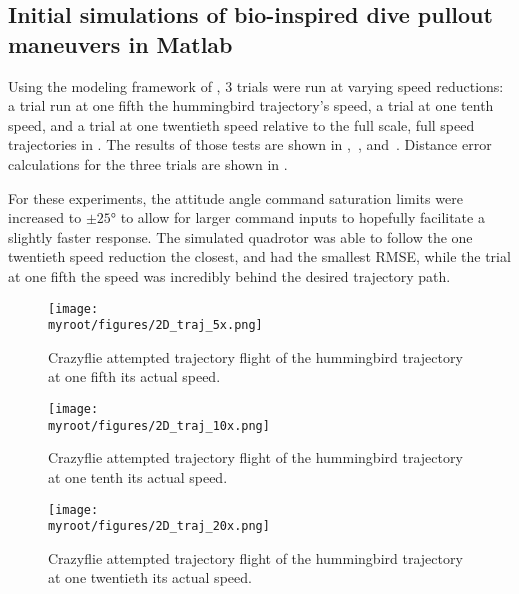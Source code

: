\documentclass[onecolumn,10pt]{IEEEtran}
\newcommand{\myroot}{../}
\newcommand{\Matlab}{Matlab}
\begin{document}
\subsection{Initial simulations of bio-inspired dive pullout maneuvers in \Matlab}
Using the modeling framework of \cite{hartman2014quadcopter}, 3 trials were run at varying speed reductions: a trial run at one fifth the hummingbird trajectory's speed, a trial at one tenth speed, and a trial at one twentieth speed relative to the full scale, full speed trajectories in \cite{clark2009courtship}. The results of those tests are shown in ,~, and~. Distance error calculations for the three trials are shown in . 

For these experiments, the attitude angle command saturation limits were increased to $\pm\ang{25}$ to allow for larger command inputs to hopefully facilitate a slightly faster response. The simulated quadrotor was able to follow the one twentieth speed reduction the closest, and had the smallest RMSE, while the trial at one fifth the speed was incredibly behind the desired trajectory path.

\begin{figure}[p]
\begin{center}
\texttt{[image: \\myroot/figures/2D\_traj\_5x.png]}
\end{center}
\caption{Crazyflie attempted trajectory flight of the hummingbird trajectory at one fifth its actual speed.}
\label{fig:onefifthspeed}
\end{figure}

\begin{figure}[p]
\begin{center}
\texttt{[image: \\myroot/figures/2D\_traj\_10x.png]}
\end{center}
\caption{Crazyflie attempted trajectory flight of the hummingbird trajectory at one tenth its actual speed.}
\label{fig:onetenthspeed}
\end{figure}

\begin{figure}[p]
\begin{center}
\texttt{[image: \\myroot/figures/2D\_traj\_20x.png]}
\end{center}
\caption{Crazyflie attempted trajectory flight of the hummingbird trajectory at one twentieth its actual speed.}
\label{fig:onetwentiethspeed}
\end{figure}
\end{document}
